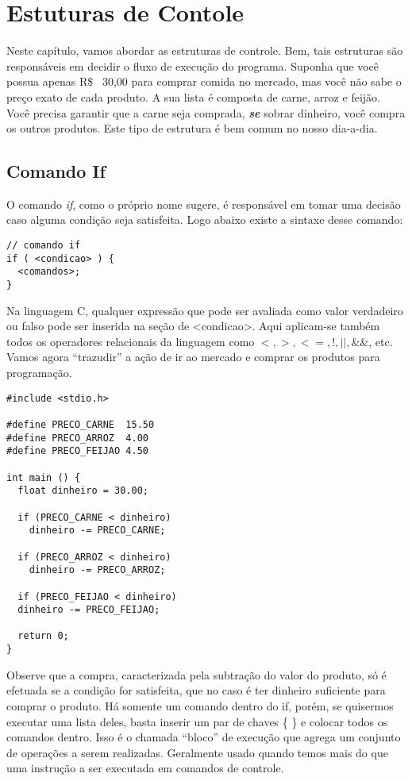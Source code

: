 
\chapter{Estuturas de Contole}

Neste capítulo, vamos abordar as estruturas de controle. Bem, tais estruturas são responsáveis em decidir o fluxo de execução do programa. Suponha que você possua apenas R\$ \ 30,00 para comprar comida no mercado, mas você não sabe o preço exato de cada produto. A sua lista é composta de carne, arroz e feijão. Você precisa garantir que a carne seja comprada, \emph{\textbf{se}} sobrar dinheiro, você compra os outros produtos. Este tipo de estrutura é bem comum no nosso dia-a-dia. 

\section{Comando If}
O comando \textit{if}, como o próprio nome sugere, é responsável em tomar uma decisão caso alguma condição seja satisfeita. Logo abaixo existe a sintaxe desse comando:


\begin{lstlisting}[label=comandoIf,caption=Comando if]
// comando if
if ( <condicao> ) {
  <comandos>;
}
\end{lstlisting}

Na linguagem C, qualquer expressão que pode ser avaliada como valor verdadeiro ou falso pode ser inserida na seção de <condicao>. Aqui aplicam-se também todos os operadores relacionais da linguagem como $<, >, <=, !, ||,  \&\&$, etc.
Vamos agora ``trazudir'' a ação de ir ao mercado e comprar os produtos para programação.


\begin{lstlisting}[label=comandoIf,caption=Comando if]
#include <stdio.h>

#define PRECO_CARNE  15.50
#define PRECO_ARROZ  4.00
#define PRECO_FEIJAO 4.50

int main () {
  float dinheiro = 30.00;
  
  if (PRECO_CARNE < dinheiro)
    dinheiro -= PRECO_CARNE;
  
  if (PRECO_ARROZ < dinheiro)
    dinheiro -= PRECO_ARROZ;
  
  if (PRECO_FEIJAO < dinheiro)
  dinheiro -= PRECO_FEIJAO;    
  
  return 0;
}
\end{lstlisting}

Observe que a compra, caracterizada pela subtração do valor do produto, só é efetuada se a condição for satisfeita, que no caso é ter dinheiro suficiente para comprar o produto.
Há somente um comando dentro do if, porém, se quisermos executar uma lista deles, basta inserir um par de chaves \{ \} e colocar todos os comandos dentro. Isso é o chamada ``bloco'' de execução que agrega um conjunto de operações a serem realizadas. Geralmente usado quando temos mais do que uma instrução a ser executada em comandos de controle.

